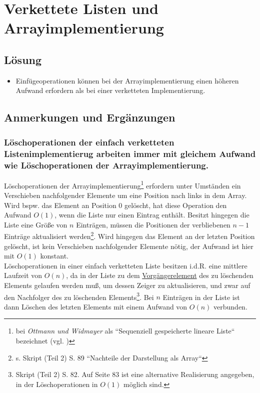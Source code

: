 \chapter{Verkettete Listen und Arrayimplementierung}

\section*{Lösung}

\begin{itemize}
    \item Einfügeoperationen können bei der Arrayimplementierung einen höheren Aufwand erfordern als bei einer verketteten Implementierung.
\end{itemize}


\section*{Anmerkungen und Ergänzungen}


\subsection*{Löschoperationen der einfach verketteten Listenimplementierug arbeiten immer mit gleichem Aufwand wie Löschoperationen der Arrayimplementierung.}

Löschoperationen der Arrayimplementierung\footnote{
bei \textit{Ottmann und Widmayer} als ``Sequenziell gespeicherte lineare Liste`` bezeichnet (vgl. \cite[30 ff.]{OW17a})
} erfordern unter Umständen ein Verschieben nachfolgender Elemente um eine Position nach links in dem Array.
Wird {bspw.} das Element an Position $0$ gelöscht, hat diese Operation den Aufwand $O(1)$, wenn die Liste nur einen Eintrag enthält.
Besitzt hingegen die Liste eine Größe von $n$ Einträgen, müssen die Positionen der verbliebenen $n-1$ Einträge aktualisiert werden\footnote{
s. Skript (Teil 2) S. 89 ``Nachteile der Darstellung als Array``
}.
Wird hingegen das Element an der letzten Position gelöscht, ist kein Verschieben nachfolgender Elemente nötig, der Aufwand ist hier mit $O(1)$ konstant.
\\

Löschoperationen in einer einfach verketteten Liste besitzen i.d.R. eine mittlere Laufzeit von $O(n)$, da in der Liste zu dem \underline{Vorgängerelement} des zu löschenden Elements gelaufen werden muß, um dessen Zeiger zu aktualisieren, und zwar auf den Nachfolger des zu löschenden Elements\footnote{
Skript (Teil 2) S. 82. Auf Seite 83 ist eine alternative Realisierung angegeben, in der Löschoperationen in $O(1)$ möglich sind.
}.
Bei $n$ Einträgen in der Liste ist dann Löschen des letzten Elements mit einem Aufwand von $O(n)$ verbunden.


